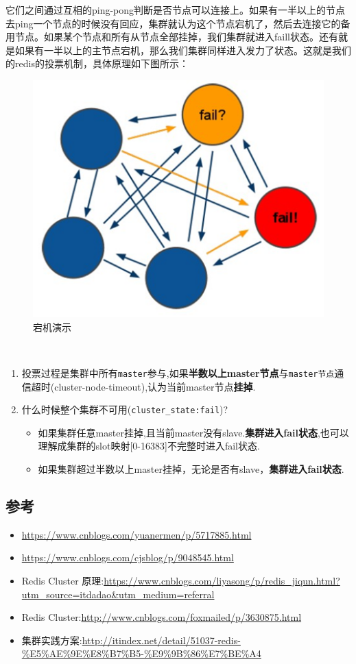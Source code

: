 \documentclass[UTF8,a4paper,12pt]{ctexbook}
\begin{document}
		它们之间通过互相的ping-pong判断是否节点可以连接上。如果有一半以上的节点去ping一个节点的时候没有回应，集群就认为这个节点宕机了，然后去连接它的备用节点。如果某个节点和所有从节点全部挂掉，我们集群就进入faill状态。还有就是如果有一半以上的主节点宕机，那么我们集群同样进入发力了状态。这就是我们的redis的投票机制，具体原理如下图所示：
			\begin{figure}[H]
				\centering
				\includegraphics[scale=0.5]{failed}
				\caption{宕机演示}
			\end{figure}　	
		
		\begin{enumerate}
			\item 投票过程是集群中所有\verb|master|参与,如果\textbf{半数以上master节点}与\verb|master节点|通信超时(cluster-node-timeout),认为当前master节点\textbf{挂掉}.
			\item 什么时候整个集群不可用(\verb|cluster_state:fail|)?
				\begin{itemize}
					\item 如果集群任意master挂掉,且当前master没有slave.\textbf{集群进入fail状态},也可以理解成集群的slot映射[0-16383]不完整时进入fail状态. 
					\item 如果集群超过半数以上master挂掉，无论是否有slave，\textbf{集群进入fail状态}.
				\end{itemize}
		\end{enumerate}
			
		\subsection{参考}
			\begin{itemize}
				\item \url{https://www.cnblogs.com/yuanermen/p/5717885.html}
				\item \url{https://www.cnblogs.com/cjsblog/p/9048545.html}
				\item Redis Cluster 原理:\url{https://www.cnblogs.com/liyasong/p/redis_jiqun.html?utm_source=itdadao&utm_medium=referral}
				\item Redis Cluster:\url{http://www.cnblogs.com/foxmailed/p/3630875.html}
				\item 集群实践方案:\url{http://itindex.net/detail/51037-redis-%E5%AE%9E%E8%B7%B5-%E9%9B%86%E7%BE%A4}
			\end{itemize}
		
\end{document}
